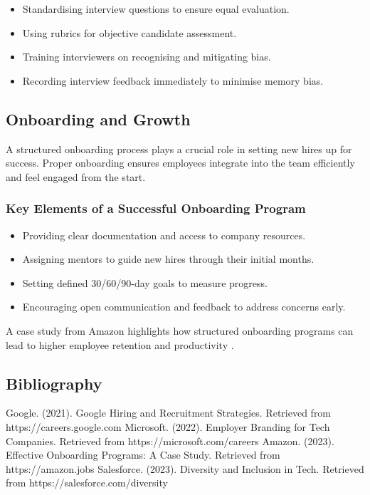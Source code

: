 \begin{itemize}
    \item Standardising interview questions to ensure equal evaluation.
    \item Using rubrics for objective candidate assessment.
    \item Training interviewers on recognising and mitigating bias.
    \item Recording interview feedback immediately to minimise memory bias.
\end{itemize}

\subsection{Onboarding and Growth}

A structured onboarding process plays a crucial role in setting new hires up for success. Proper onboarding ensures employees integrate into the team efficiently and feel engaged from the start.

\subsubsection{Key Elements of a Successful Onboarding Program}

\begin{itemize}
    \item Providing clear documentation and access to company resources.
    \item Assigning mentors to guide new hires through their initial months.
    \item Setting defined 30/60/90-day goals to measure progress.
    \item Encouraging open communication and feedback to address concerns early.
\end{itemize}

A case study from Amazon highlights how structured onboarding programs can lead to higher employee retention and productivity \cite{AmazonOnboarding}.

\subsection{Bibliography}

\begin{thebibliography}{9}
     Google. (2021). Google Hiring and Recruitment Strategies. Retrieved from https://careers.google.com
     Microsoft. (2022). Employer Branding for Tech Companies. Retrieved from https://microsoft.com/careers
     Amazon. (2023). Effective Onboarding Programs: A Case Study. Retrieved from https://amazon.jobs
     Salesforce. (2023). Diversity and Inclusion in Tech. Retrieved from https://salesforce.com/diversity
\end{thebibliography}

